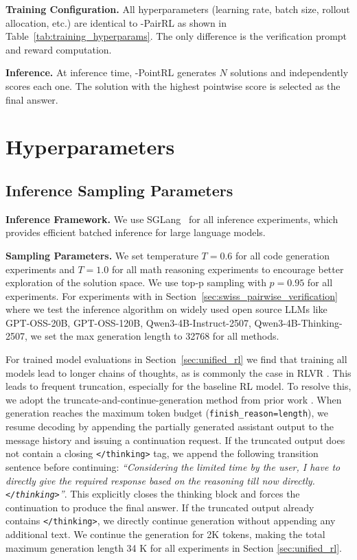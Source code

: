 \textbf{Training Configuration.} All hyperparameters (learning rate, batch size, rollout allocation, etc.) are identical to \method{}-PairRL as shown in Table~\ref{tab:training_hyperparams}. The only difference is the verification prompt and reward computation.

\textbf{Inference.} At inference time, \method{}-PointRL generates $N$ solutions and independently scores each one. The solution with the highest pointwise score is selected as the final answer.


\section{Hyperparameters}
\label{sec:appendix_hyperparams}

\subsection{Inference Sampling Parameters}
\label{sec:appendix_inference_hyperparams}

\textbf{Inference Framework.} We use SGLang~\citep{zheng2024sglangefficientexecutionstructured} for all inference experiments, which provides efficient batched inference for large language models.

\textbf{Sampling Parameters.} We set temperature $T=0.6$ for all code generation experiments and $T=1.0$ for all math reasoning experiments to encourage better exploration of the solution space. We use top-p sampling with $p=0.95$ for all experiments. For experiments with \pairinfer{} in Section~\ref{sec:swiss_pairwise_verification} where we test the inference algorithm on widely used open source LLMs like GPT-OSS-20B, GPT-OSS-120B, Qwen3-4B-Instruct-2507, Qwen3-4B-Thinking-2507, we set the max generation length to 32768 for all methods.

For trained model evaluations in Section~\ref{sec:unified_rl} we find that training all models lead to longer chains of thoughts, as is commonly the case in RLVR \citep{deepseekai2025deepseekr1incentivizingreasoningcapability}. This leads to frequent truncation, especially for the baseline RL model. To resolve this, we adopt the truncate-and-continue-generation method from prior work \citep{yang2025qwen3technicalreport, sareen2025puttingvaluerlbetter}. When generation reaches the maximum token budget (\texttt{finish\_reason=length}), we resume decoding by appending the partially generated assistant output to the message history and issuing a continuation request. If the truncated output does not contain a closing \texttt{</thinking>} tag, we append the following transition sentence before continuing: \emph{``Considering the limited time by the user, I have to directly give the required response based on the reasoning till now directly.\texttt{</thinking>}''}. This explicitly closes the thinking block and forces the continuation to produce the final answer. If the truncated output already contains \texttt{</thinking>}, we directly continue generation without appending any additional text. We continue the generation for 2K tokens, making the total maximum generation length 34 K for all experiments in Section \ref{sec:unified_rl}.


